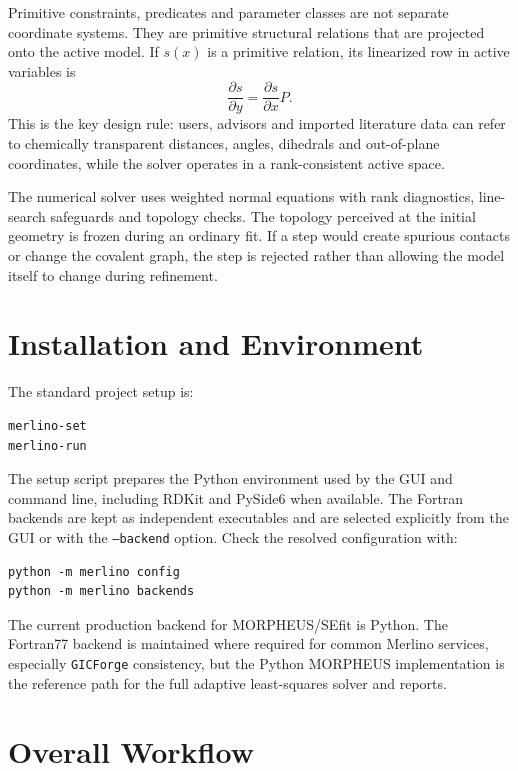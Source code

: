\documentclass[11pt]{article}
\newcommand{\gicforge}{\texttt{GICForge}}
\begin{document}
Primitive constraints, predicates and parameter classes are not separate
coordinate systems.  They are primitive structural relations that are projected
onto the active model.  If \(s(x)\) is a primitive relation, its linearized row
in active variables is
\[
  \frac{\partial s}{\partial y}
  =
  \frac{\partial s}{\partial x}P .
\]
This is the key design rule: users, advisors and imported literature data can
refer to chemically transparent distances, angles, dihedrals and out-of-plane
coordinates, while the solver operates in a rank-consistent active space.

The numerical solver uses weighted normal equations with rank diagnostics,
line-search safeguards and topology checks.  The topology perceived at the
initial geometry is frozen during an ordinary fit.  If a step would create
spurious contacts or change the covalent graph, the step is rejected rather
than allowing the model itself to change during refinement.

\section{Installation and Environment}

The standard project setup is:

\begin{lstlisting}[style=merlino]
merlino-set
merlino-run
\end{lstlisting}

\noindent
The setup script prepares the Python environment used by the GUI and command
line, including RDKit and PySide6 when available.  The Fortran backends are
kept as independent executables and are selected explicitly from the GUI or
with the \texttt{--backend} option.  Check the resolved configuration with:

\begin{lstlisting}[style=merlino]
python -m merlino config
python -m merlino backends
\end{lstlisting}

\noindent
The current production backend for MORPHEUS/SEfit is Python.  The Fortran77 backend
is maintained where required for common Merlino services, especially
\gicforge{} consistency, but the Python MORPHEUS implementation is the
reference path for the full adaptive least-squares solver and reports.

\section{Overall Workflow}
\end{document}
